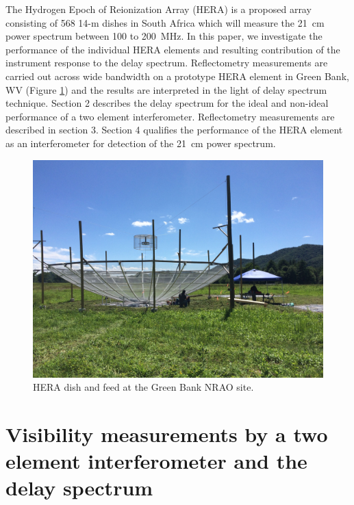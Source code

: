 \documentclass[iop]{emulateapj}
\begin{document}
The Hydrogen Epoch of Reionization Array (HERA) is a proposed array consisting of 568 14-m dishes in South Africa which will measure the 21~cm power spectrum between 100 to 200~MHz.
In this paper, we investigate the performance of the individual HERA elements and resulting contribution of the instrument response to the delay spectrum.
 Reflectometry measurements  are carried out across wide bandwidth on a prototype HERA element in Green
Bank, WV (Figure \ref{fig:heradish}) and the results are interpreted in the light of delay spectrum technique. Section 2 describes the delay spectrum for the ideal and non-ideal performance of a two element interferometer. Reflectometry measurements are described in section 3. Section 4 qualifies the performance of the HERA element as an interferometer for detection of the 21~cm power spectrum.


\begin{figure}
\centering
\includegraphics[trim={2cm 20cm 30cm 15cm},clip, totalheight=0.3\textheight]{plots/heradish.jpg}
\caption{HERA dish and feed at the Green Bank NRAO site.}
\label{fig:heradish}
\end{figure}

\section{Visibility measurements by a two element interferometer and the delay spectrum}
\end{document}
